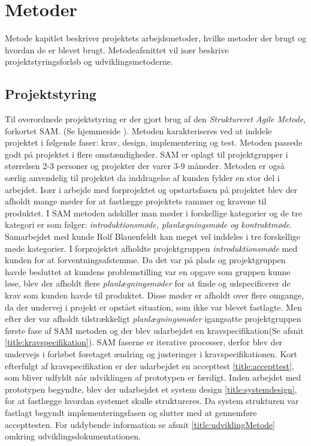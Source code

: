 \chapter{Metoder}
Metode kapitlet beskriver projektets arbejdsmetoder, hvilke metoder der brugt og hvordan de er blevet brugt. Metodeafsnittet vil især beskrive projektstyringsforløb og udviklingsmetoderne. 

\section{Projektstyring} \label{title:projektstyring}
Til overordnede projektstyring er der gjort brug af den \textit{Struktureret Agile Metode}, forkortet SAM. (Se hjemmeside ). Metoden karakteriseres ved at inddele projektet i følgende faser: krav, design, implementering og test. Metoden passede godt på projektet i flere omstændigheder. SAM er oplagt til projektgrupper i størrelsen 2-3 personer og projekter der varer 3-9 måneder. Metoden er også særlig anvendelig til projektet da inddragelse af kunden fylder en stor del i arbejdet. 
Især i arbejde med forprojektet og opstartsfasen på projektet blev der afholdt mange møder for at fastlægge projektets rammer og kravene til produktet. I SAM metoden adskiller man møder i forskellige kategorier og de tre kategori er som følger: \textit{introduktionsmøde, planlægningsmøde og kontraktmøde}. Samarbejdet med kunde Rolf Blauenfeldt kan meget vel inddeles i tre forskellige møde kategorier. I forprojektet afholdte projektgruppen \textit{introduktionsmøde} med kunden for at forventningsafstemme. Da det var på plads og projektgruppen havde besluttet at kundens problemstilling var en opgave som gruppen kunne løse, blev der afholdt flere \textit{planlægningsmøder} for at finde og udspecificerer de  krav som kunden havde til produktet. Disse møder er afholdt over flere omgange, da der undervej i projekt er opstået situation, som ikke var blevet fastlagte. Men efter der var afholdt tilstrækkeligt \textit{planlægningsmøder} igangsatte projektgruppen første fase af SAM metoden og der blev udarbejdet en kravspecifikation(Se afsnit \ref{title:kravspecifikation}). SAM faserne er iterative processer, derfor blev der undervejs i forløbet  foretaget ændring og justeringer i kravspecifikationen. Kort efterfulgt af kravspecifikation er der udarbejdet en accepttest \ref{title:accepttest}, som bliver udfyldt når udviklingen af prototypen er færdigt. Inden arbejdet med prototypen begyndte, blev der udarbejdet et system design \ref{title:systemdesign}, for at fastlægge hvordan systemet skulle struktureres. Da system strukturen var fastlagt begyndt implementeringsfasen og slutter med at gennemføre accepttesten. For uddybende information se afsnit \ref{title:udviklingMetode} omkring udviklingsdokumentationen.

